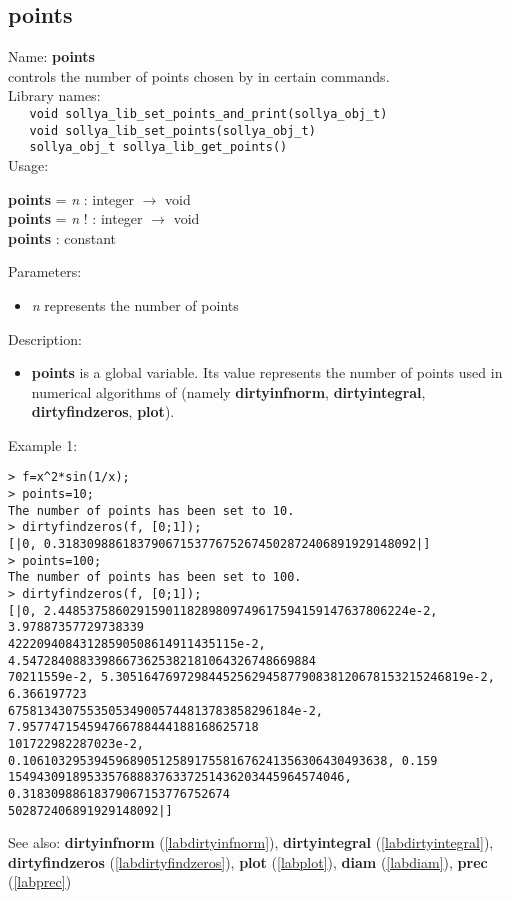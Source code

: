 \subsection{points}
\label{labpoints}
\noindent Name: \textbf{points}\\
\phantom{aaa}controls the number of points chosen by \sollya in certain commands.\\[0.2cm]
\noindent Library names:\\
\verb|   void sollya_lib_set_points_and_print(sollya_obj_t)|\\
\verb|   void sollya_lib_set_points(sollya_obj_t)|\\
\verb|   sollya_obj_t sollya_lib_get_points()|\\[0.2cm]
\noindent Usage: 
\begin{center}
\textbf{points} = \emph{n} : \textsf{integer} $\rightarrow$ \textsf{void}\\
\textbf{points} = \emph{n} ! : \textsf{integer} $\rightarrow$ \textsf{void}\\
\textbf{points} : \textsf{constant}\\
\end{center}
Parameters: 
\begin{itemize}
\item \emph{n} represents the number of points
\end{itemize}
\noindent Description: \begin{itemize}

\item \textbf{points} is a global variable. Its value represents the number of points
   used in numerical algorithms of \sollya (namely \textbf{dirtyinfnorm},
   \textbf{dirtyintegral}, \textbf{dirtyfindzeros}, \textbf{plot}).
\end{itemize}
\noindent Example 1: 
\begin{center}\begin{minipage}{15cm}\begin{Verbatim}[frame=single]
> f=x^2*sin(1/x);
> points=10;
The number of points has been set to 10.
> dirtyfindzeros(f, [0;1]);
[|0, 0.31830988618379067153776752674502872406891929148092|]
> points=100;
The number of points has been set to 100.
> dirtyfindzeros(f, [0;1]);
[|0, 2.4485375860291590118289809749617594159147637806224e-2, 3.97887357729738339
42220940843128590508614911435115e-2, 4.54728408833986673625382181064326748669884
70211559e-2, 5.3051647697298445256294587790838120678153215246819e-2, 6.366197723
6758134307553505349005744813783858296184e-2, 7.957747154594766788444188168625718
101722982287023e-2, 0.106103295394596890512589175581676241356306430493638, 0.159
15494309189533576888376337251436203445964574046, 0.31830988618379067153776752674
502872406891929148092|]
\end{Verbatim}
\end{minipage}\end{center}
See also: \textbf{dirtyinfnorm} (\ref{labdirtyinfnorm}), \textbf{dirtyintegral} (\ref{labdirtyintegral}), \textbf{dirtyfindzeros} (\ref{labdirtyfindzeros}), \textbf{plot} (\ref{labplot}), \textbf{diam} (\ref{labdiam}), \textbf{prec} (\ref{labprec})
